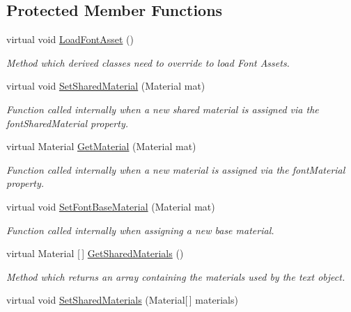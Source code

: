 \subsection*{Protected Member Functions}
\begin{DoxyCompactItemize}
\item 
virtual void \mbox{\hyperlink{class_t_m_pro_1_1_t_m_p___text_a02b60cb23d3eceb1ea52a61f194d8bec}{Load\+Font\+Asset}} ()
\begin{DoxyCompactList}\small\item\em Method which derived classes need to override to load Font Assets. \end{DoxyCompactList}\item 
virtual void \mbox{\hyperlink{class_t_m_pro_1_1_t_m_p___text_abccb3148b9e3fceee9b80807d75c0196}{Set\+Shared\+Material}} (Material mat)
\begin{DoxyCompactList}\small\item\em Function called internally when a new shared material is assigned via the font\+Shared\+Material property. \end{DoxyCompactList}\item 
virtual Material \mbox{\hyperlink{class_t_m_pro_1_1_t_m_p___text_a0a573365fce6e2d9e49b0f7d6679834b}{Get\+Material}} (Material mat)
\begin{DoxyCompactList}\small\item\em Function called internally when a new material is assigned via the font\+Material property. \end{DoxyCompactList}\item 
virtual void \mbox{\hyperlink{class_t_m_pro_1_1_t_m_p___text_a7ce68525afb782cd0d6b3f1a13633c0c}{Set\+Font\+Base\+Material}} (Material mat)
\begin{DoxyCompactList}\small\item\em Function called internally when assigning a new base material. \end{DoxyCompactList}\item 
virtual Material \mbox{[}$\,$\mbox{]} \mbox{\hyperlink{class_t_m_pro_1_1_t_m_p___text_a187cdc5ab36e0006fa0516f208a3cffd}{Get\+Shared\+Materials}} ()
\begin{DoxyCompactList}\small\item\em Method which returns an array containing the materials used by the text object. \end{DoxyCompactList}\item 
virtual void \mbox{\hyperlink{class_t_m_pro_1_1_t_m_p___text_abd5a99f8e985bc1808f4dee6b268c7e1}{Set\+Shared\+Materials}} (Material\mbox{[}$\,$\mbox{]} materials)

\end{DoxyCompactItemize}
